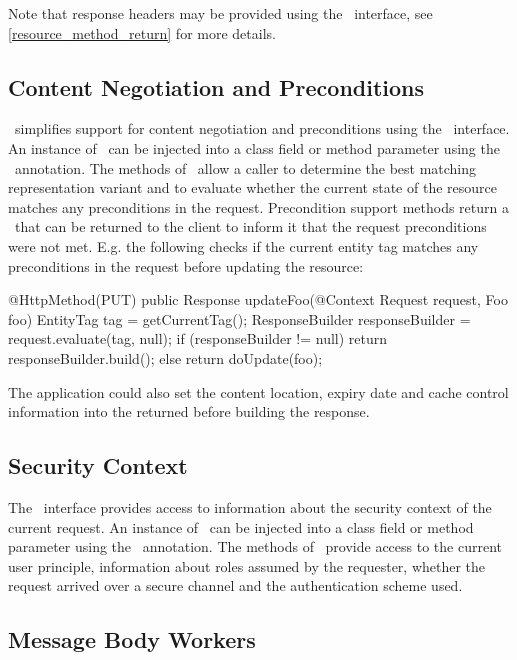 Note that response headers may be provided using the \Response\ interface, see \ref{resource_method_return} for more details.

\subsection{Content Negotiation and Preconditions}

\jaxrs\ simplifies support for content negotiation and preconditions using the \Request\ interface. An instance of \Request\ can be injected into a class field or method parameter using the \Context\ annotation. The methods of \Request\ allow a caller to determine the best matching representation variant and to evaluate whether the current state of the resource matches any preconditions in the request. Precondition support methods return a \ResponseBuilder\ that can be returned to the client to inform it that the request preconditions were not met. E.g. the following checks if the current entity tag matches any preconditions in the request before updating the resource:

\begin{listing}{1}
@HttpMethod(PUT)
public Response updateFoo(@Context Request request, Foo foo) {
	EntityTag tag = getCurrentTag();
	ResponseBuilder responseBuilder = request.evaluate(tag, null);
	if (responseBuilder != null)
	  return responseBuilder.build();
	else
	  return doUpdate(foo);
}
\end{listing}


The application could also set the content location, expiry date and cache control information into the returned  before building the response.

\subsection{Security Context}

The \SecurityContext\ interface provides access to information about the security context of the current request. An instance of \SecurityContext\ can be injected into a class field or method parameter using the \Context\ annotation. The methods of \SecurityContext\ provide access to the current user principle, information about roles assumed by the requester, whether the request arrived over a secure channel and the authentication scheme used.

\subsection{Message Body Workers}

